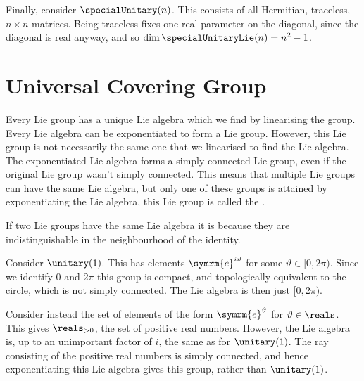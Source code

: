 \documentclass[fleqn]{NotesClass}
\newcommand{\e}{\symrm{e}}
\begin{document}
    Finally, consider \(\specialUnitary(n)\).
    This consists of all Hermitian, traceless, \(n \times n\) matrices.
    Being traceless fixes one real parameter on the diagonal, since the diagonal is real anyway, and so \(\dim \specialUnitaryLie(n) = n^2 - 1\).
    
    \section{Universal Covering Group}
    Every Lie group has a unique Lie algebra which we find by linearising the group.
    Every Lie algebra can be exponentiated to form a Lie group.
    However, this Lie group is not necessarily the same one that we linearised to find the Lie algebra.
    The exponentiated Lie algebra forms a simply connected Lie group, even if the original Lie group wasn't simply connected.
    This means that multiple Lie groups can have the same Lie algebra, but only one of these groups is attained by exponentiating the Lie algebra, this Lie group is called the .
    
    If two Lie groups have the same Lie algebra it is because they are indistinguishable in the neighbourhood of the identity.
    
    \begin{exm}{}{}
        Consider \(\unitary(1)\).
        This has elements \(\e^{i\vartheta}\) for some \(\vartheta \in [0, 2\pi)\).
        Since we identify \(0\) and \(2\pi\) this group is compact, and topologically equivalent to the circle, which is not simply connected.
        The Lie algebra is then just \([0, 2\pi)\).
        
        Consider instead the set of elements of the form \(\e^{\vartheta}\) for \(\vartheta \in \reals\).
        This gives \(\reals_{>0}\), the set of positive real numbers.
        However, the Lie algebra is, up to an unimportant factor of \(i\), the same as for \(\unitary(1)\).
        The ray consisting of the positive real numbers is simply connected, and hence exponentiating this Lie algebra gives this group, rather than \(\unitary(1)\).
    \end{exm}
    
\end{document}
